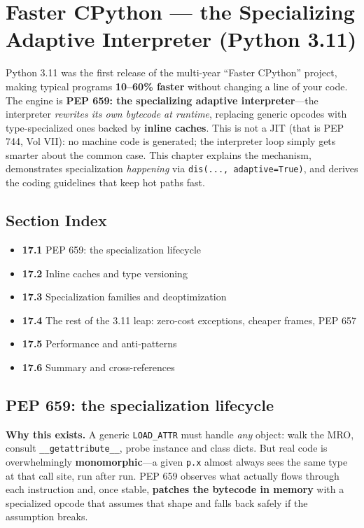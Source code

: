 \chapter{Faster CPython --- the Specializing Adaptive Interpreter (Python 3.11)}

Python 3.11 was the first release of the multi-year ``Faster CPython'' project, making typical
programs \textbf{10--60\% faster} without changing a line of your code. The engine is \textbf{PEP
659: the specializing adaptive interpreter}---the interpreter \emph{rewrites its own bytecode at
runtime}, replacing generic opcodes with type-specialized ones backed by \textbf{inline caches}.
This is not a JIT (that is PEP 744, Vol VII): no machine code is generated; the interpreter loop
simply gets smarter about the common case. This chapter explains the mechanism, demonstrates
specialization \emph{happening} via \texttt{dis(..., adaptive=True)}, and derives the coding
guidelines that keep hot paths fast.

\section*{Section Index}
\begin{itemize}
  \item \textbf{17.1} PEP 659: the specialization lifecycle
  \item \textbf{17.2} Inline caches and type versioning
  \item \textbf{17.3} Specialization families and deoptimization
  \item \textbf{17.4} The rest of the 3.11 leap: zero-cost exceptions, cheaper frames, PEP 657
  \item \textbf{17.5} Performance and anti-patterns
  \item \textbf{17.6} Summary and cross-references
\end{itemize}

\section{PEP 659: the specialization lifecycle}

\textbf{Why this exists.} A generic \texttt{LOAD\_ATTR} must handle \emph{any} object: walk the MRO,
consult \texttt{\_\_getattribute\_\_}, probe instance and class dicts. But real code is overwhelmingly
\textbf{monomorphic}---a given \texttt{p.x} almost always sees the same type at that call site, run
after run. PEP 659 observes what actually flows through each instruction and, once stable,
\textbf{patches the bytecode in memory} with a specialized opcode that assumes that shape and falls
back safely if the assumption breaks.

